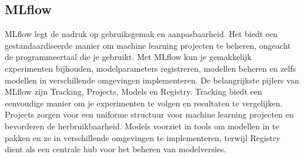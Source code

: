 \subsection{MLflow}
MLflow legt de nadruk op gebruiksgemak en aanpasbaarheid. Het biedt een gestandaardiseerde manier om machine learning projecten te beheren, ongeacht de programmeertaal die je gebruikt. Met MLflow kun je gemakkelijk experimenten bijhouden, modelparameters registreren, modellen beheren en zelfs modellen in verschillende omgevingen implementeren.
De belangrijkste pijlers van MLflow zijn Tracking, Projects, Models en Registry. Tracking biedt een eenvoudige manier om je experimenten te volgen en resultaten te vergelijken. Projects zorgen voor een uniforme structuur voor machine learning projecten en bevorderen de herbruikbaarheid. Models voorziet in tools om modellen in te pakken en ze in verschillende omgevingen te implementeren, terwijl Registry dient als een centrale hub voor het beheren van modelversies.






